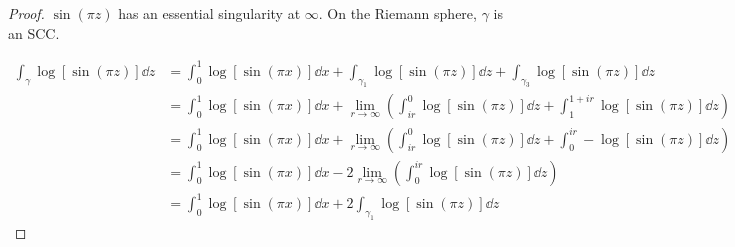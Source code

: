 \documentclass[../psets.tex]{subfiles}
\begin{document}
\begin{enumerate}[label={\textbf{\arabic*.}}]
\begin{proof}
        $\sin(\pi z)$ has an essential singularity at $\infty$. On the Riemann sphere, $\gamma$ is an SCC.

        \begin{align*}
            \int_\gamma\log[\sin(\pi z)]\dd{z} &= \int_0^1\log[\sin(\pi x)]\dd{x}+\int_{\gamma_1}\log[\sin(\pi z)]\dd{z}+\int_{\gamma_3}\log[\sin(\pi z)]\dd{z}\\
            &= \int_0^1\log[\sin(\pi x)]\dd{x}+\lim_{r\to\infty}\left( \int_{ir}^0\log[\sin(\pi z)]\dd{z}+\int_1^{1+ir}\log[\sin(\pi z)]\dd{z} \right)\\
            &= \int_0^1\log[\sin(\pi x)]\dd{x}+\lim_{r\to\infty}\left( \int_{ir}^0\log[\sin(\pi z)]\dd{z}+\int_0^{ir}-\log[\sin(\pi z)]\dd{z} \right)\\
            &= \int_0^1\log[\sin(\pi x)]\dd{x}-2\lim_{r\to\infty}\left( \int_0^{ir}\log[\sin(\pi z)]\dd{z} \right)\\
            &= \int_0^1\log[\sin(\pi x)]\dd{x}+2\int_{\gamma_1}\log[\sin(\pi z)]\dd{z}
        \end{align*}
    \end{proof}
\end{enumerate}
\end{document}
